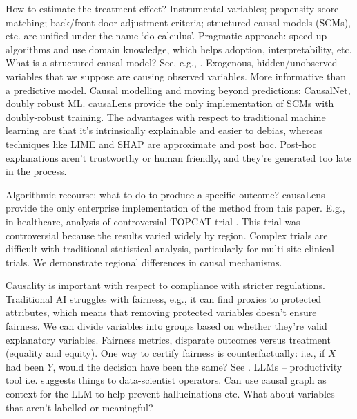 How to estimate the treatment effect?
Instrumental variables; propensity score matching; back/front-door adjustment criteria;
structured causal models (SCMs), etc. are unified under the name `do-calculus'.
Pragmatic approach: speed up algorithms and use domain knowledge, which helps adoption,
interpretability, etc. What is a structured causal model?
See, e.g., \textcites{Peters2017a}.
Exogenous, hidden/unobserved variables that we suppose are causing observed variables.
More informative than a predictive model.
Causal modelling and moving beyond predictions: CausalNet, doubly robust ML.
causaLens provide the only implementation of SCMs with doubly-robust training.
The advantages with respect to traditional machine learning are that it's intrinsically
explainable and easier to debias, whereas techniques like LIME and SHAP are approximate
and post hoc.
Post-hoc explanations aren't trustworthy or human friendly, and they're generated too
late in the process.

Algorithmic recourse: what to do to produce a specific outcome?
causaLens provide the only enterprise implementation of the method from this paper.
E.g., in healthcare, analysis of controversial TOPCAT trial \parencites{Raimondi2022}.
This trial was controversial because the results varied widely by region.
Complex trials are difficult with traditional statistical analysis, particularly for
multi-site clinical trials.
We demonstrate regional differences in causal mechanisms.

Causality is important with respect to compliance with stricter regulations.
Traditional AI struggles with fairness, e.g., it can find proxies to protected
attributes, which means that removing protected variables doesn't ensure fairness.
We can divide variables into groups based on whether they're valid explanatory
variables.
Fairness metrics, disparate outcomes versus treatment (equality and equity).
One way to certify fairness is counterfactually: i.e., if $X$ had been $Y$, would the
decision have been the same?
See \textcites{Raimondi2022a}.
LLMs -- productivity tool i.e. suggests things to data-scientist operators.
Can use causal graph as context for the LLM to help prevent hallucinations etc. What
about variables that aren't labelled or meaningful?

